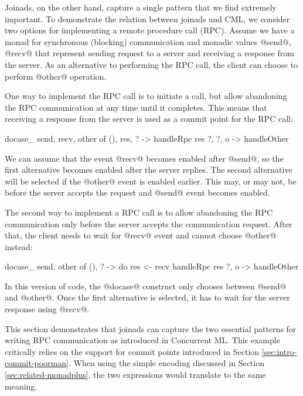 \documentclass[preprint]{sigplanconf}
\begin{document}
Joinads, on the other hand, capture a single pattern that we find extremely important. To 
demonstrate the relation between joinads and CML, we consider two options for implementing a 
remote procedure call (RPC). Assume we have a monad for synchronous (blocking) communication
and monadic values @send@, @recv@ that represent sending request to a server and receiving
a response from the server. As an alternative to performing the RPC call, the client can choose
to perform @other@ operation.

One way to implement the RPC call is to initiate a call, but allow abandoning the RPC communication
at any time until it completes. This means that receiving a response from the server is used
as a commit point for the RPC call:

\begin{code}
docase_ send, recv, other of
  (), res, ?  -> handleRpc res
  ?, ?, o     -> handleOther
\end{code}
We can assume that the event @recv@ becomes enabled after @send@, so the first alternative becomes
enabled after the server replies. The second alternative will be selected if the @other@ event is
enabled earlier. This may, or may not, be before the server accepts the request and @send@ event
becomes enabled.

The second way to implement a RPC call is to allow abandoning the RPC communication only before
the server accepts the communication request. After that, the client needs to wait for @recv@ event
and cannot choose @other@ instead:

\begin{code}
docase_ send, other of
  (), ?  ->  do res <- recv
             handleRpc res
  ?, o   ->  handleOther
\end{code}
In this version of code, the @docase@ construct only chooses between @send@ and @other@. Once the
first alternative is selected, it has to wait for the server response using @recv@.

This section demonstrates that joinads can capture the two essential patterns for writing RPC
communication as introduced in Concurrent ML. This example critically relies on the support for
commit points introduced in Section \ref{sec:intro-commit-poorman}. When using the simple encoding
discussed in Section \ref{sec:related-monadplus}, the two expressions would translate to the 
same meaning.

\end{document}
